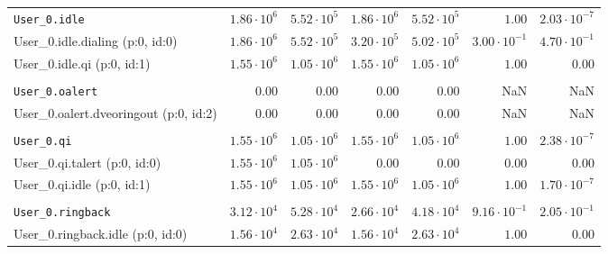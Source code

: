 \begin{table}[htbp]
{\begin{tabular}{lrrrrrr}
\\[-8pt]\texttt{User\_0.idle}                        & $1.86 \cdot 10^{6}$ & $5.52 \cdot 10^{5}$ & $1.86 \cdot 10^{6}$ & $5.52 \cdot 10^{5}$ &               $1.00$ & $2.03 \cdot 10^{-7}$ \\
\hspace{3mm}User\_0.idle.dialing (p:0, id:0)         & $1.86 \cdot 10^{6}$ & $5.52 \cdot 10^{5}$ & $3.20 \cdot 10^{5}$ & $5.02 \cdot 10^{5}$ & $3.00 \cdot 10^{-1}$ & $4.70 \cdot 10^{-1}$ \\
\hspace{3mm}User\_0.idle.qi (p:0, id:1)              & $1.55 \cdot 10^{6}$ & $1.05 \cdot 10^{6}$ & $1.55 \cdot 10^{6}$ & $1.05 \cdot 10^{6}$ &               $1.00$ &               $0.00$ \\
\\[-8pt]\texttt{User\_0.oalert}                      &              $0.00$ &              $0.00$ &              $0.00$ &              $0.00$ &                  NaN &                  NaN \\
\hspace{3mm}User\_0.oalert.dveoringout (p:0, id:2)   &              $0.00$ &              $0.00$ &              $0.00$ &              $0.00$ &                  NaN &                  NaN \\
\\[-8pt]\texttt{User\_0.qi}                          & $1.55 \cdot 10^{6}$ & $1.05 \cdot 10^{6}$ & $1.55 \cdot 10^{6}$ & $1.05 \cdot 10^{6}$ &               $1.00$ & $2.38 \cdot 10^{-7}$ \\
\hspace{3mm}User\_0.qi.talert (p:0, id:0)            & $1.55 \cdot 10^{6}$ & $1.05 \cdot 10^{6}$ &              $0.00$ &              $0.00$ &               $0.00$ &               $0.00$ \\
\hspace{3mm}User\_0.qi.idle (p:0, id:1)              & $1.55 \cdot 10^{6}$ & $1.05 \cdot 10^{6}$ & $1.55 \cdot 10^{6}$ & $1.05 \cdot 10^{6}$ &               $1.00$ & $1.70 \cdot 10^{-7}$ \\
\\[-8pt]\texttt{User\_0.ringback}                    & $3.12 \cdot 10^{4}$ & $5.28 \cdot 10^{4}$ & $2.66 \cdot 10^{4}$ & $4.18 \cdot 10^{4}$ & $9.16 \cdot 10^{-1}$ & $2.05 \cdot 10^{-1}$ \\
\hspace{3mm}User\_0.ringback.idle (p:0, id:0)        & $1.56 \cdot 10^{4}$ & $2.63 \cdot 10^{4}$ & $1.56 \cdot 10^{4}$ & $2.63 \cdot 10^{4}$ &               $1.00$ &               $0.00$ \\

\end{tabular}}
\end{table}
